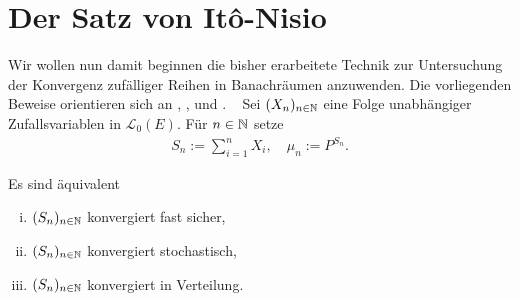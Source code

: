 \section{Der Satz von Itô-Nisio}
    Wir wollen nun damit beginnen die bisher erarbeitete Technik zur Untersuchung der Konvergenz zufälliger Reihen in Banachräumen anzuwenden.
    Die vorliegenden Beweise orientieren sich an \cite{ito-nisio}, \cite{ledoux-talagrand}, \cite{li-queffelec} und \cite{van-neerven}.  
    \newline \ \newline 
    Sei $(X_n)_{n \in \mathbb{N}}$ eine Folge unabhängiger Zufallsvariablen in $\mathcal{L}_0(E)$. Für $n \in \mathbb{N}$ setze
    \begin{align*}
    S_n := \sum_{i=1}^n X_i, 
    \quad 
    \mu_n := P^{S_n} .
    \end{align*}
\begin{theorem}
    Es sind äquivalent
    \begin{enumerate}[(i)]
        \item $(S_n)_{n \in \mathbb{N}}$ konvergiert fast sicher, 
        \item $(S_n)_{n \in \mathbb{N}}$ konvergiert stochastisch, 
        \item $(S_n)_{n \in \mathbb{N}}$ konvergiert in Verteilung. 
    \end{enumerate}
\end{theorem}

